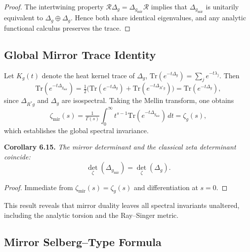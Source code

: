 \begin{proof}
The intertwining property \(\mathcal{R}\Delta_g = \Delta_{g_{\mathrm{mir}}}\mathcal{R}\)
implies that \(\Delta_{g_{\mathrm{mir}}}\)
is unitarily equivalent to \(\Delta_g\oplus \Delta_g\).
Hence both share identical eigenvalues,
and any analytic functional calculus preserves the trace.
\end{proof}

\subsection{Global Mirror Trace Identity}\relax \hspace{0pt}

Let \(K_g(t)\) denote the heat kernel trace of \(\Delta_g\),
\(\mathrm{Tr}(e^{-t\Delta_g})=\sum_{j}e^{-t\lambda_j}\).
Then
\[
\mathrm{Tr}(e^{-t\Delta_{g_{\mathrm{mir}}}})
=\tfrac{1}{2}\big(
\mathrm{Tr}(e^{-t\Delta_g})
+\mathrm{Tr}(e^{-t\Delta_{R^{*}g}})
\big)
=\mathrm{Tr}(e^{-t\Delta_g}),
\]
since \(\Delta_{R^{*}g}\) and \(\Delta_g\) are isospectral.
Taking the Mellin transform, one obtains
\begin{equation}
\zeta_{\mathrm{mir}}(s)
=\tfrac{1}{\Gamma(s)}
\int_{0}^{\infty}t^{s-1}\mathrm{Tr}(e^{-t\Delta_{g_{\mathrm{mir}}}})\,dt
=\zeta_g(s),
\end{equation}
which establishes the global spectral invariance.

\noindent
\textbf{Corollary 6.15.}
\emph{The mirror determinant and the classical zeta determinant coincide:}
\[
\det_{\zeta}(\Delta_{g_{\mathrm{mir}}})
=\det_{\zeta}(\Delta_g).
\]

\begin{proof}
Immediate from \(\zeta_{\mathrm{mir}}(s)=\zeta_g(s)\)
and differentiation at \(s=0\).
\end{proof}

This result reveals that mirror duality leaves all spectral invariants
unaltered, including the analytic torsion and the Ray–Singer metric.

\subsection{Mirror Selberg–Type Formula}\relax \hspace{0pt}

